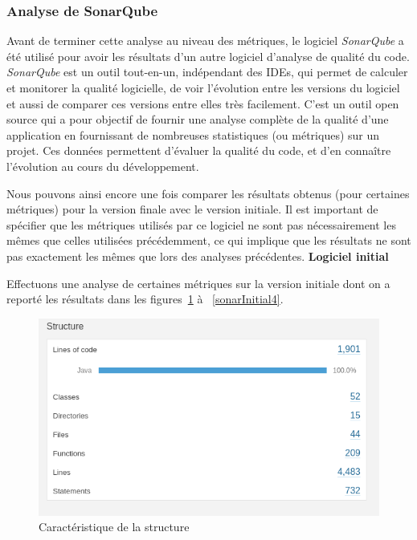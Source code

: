 \documentclass[12pt, openany]{report}
\begin{document}
\subsubsection*{\textbf{\large{Analyse de SonarQube}}}

Avant de terminer cette analyse au niveau des métriques, le logiciel \textit{SonarQube} a été utilisé pour avoir les résultats d'un autre logiciel d'analyse de qualité du code. \textit{SonarQube} est un outil tout-en-un, indépendant des IDEs, qui permet de calculer et monitorer la qualité logicielle, de voir l'évolution entre les versions du logiciel et aussi de comparer ces versions entre elles très facilement. C'est un outil open source qui a pour objectif de fournir une analyse complète de la qualité d'une application en fournissant de nombreuses statistiques (ou métriques) sur un projet. Ces données permettent d'évaluer la qualité du code, et d'en connaître l'évolution au cours du développement.


Nous pouvons ainsi encore une fois comparer les résultats obtenus (pour certaines métriques) pour la version finale avec le version initiale. Il est important de spécifier que les métriques utilisés par ce logiciel ne sont pas nécessairement les mêmes que celles utilisées précédemment, ce qui implique que les résultats ne sont pas exactement les mêmes que lors des analyses précédentes.
\newpage
\textbf{Logiciel initial}

Effectuons une analyse de certaines métriques sur la version initiale dont on a reporté les résultats dans les figures~\ref{sonarInitial1} à ~\ref{sonarInitial4}.

\begin{figure}[!h]
	\centering
	\includegraphics[scale=0.5]{Images/sonarInitial1.png} 
	\caption{Caractéristique de la structure}
	\label{sonarInitial1}
\end{figure} 
\end{document}
